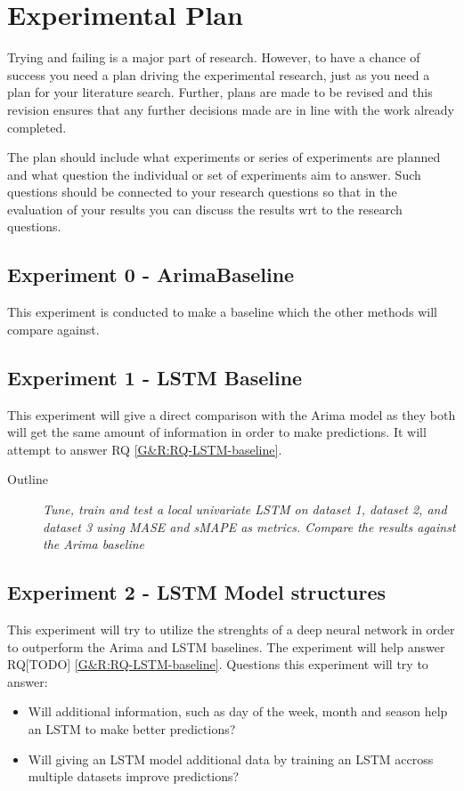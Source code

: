 
\section{Experimental Plan}
\label{sec:experimentalPlan}

Trying and failing is a major part of research. However, to have a chance of success you need a plan driving the experimental research, just as you need a plan for your literature search. Further, plans are made to be revised and this revision ensures that any further decisions made are in line with the work already completed.

The plan should include what experiments or series of experiments are planned and what question the individual or set of experiments aim to answer. Such questions should be connected to your research questions so that in the evaluation of your results you can discuss the results wrt to the research questions.


\subsection{Experiment 0 - ArimaBaseline}
This experiment is conducted to make a baseline which the other methods
will compare against.

\subsection{Experiment 1 - LSTM Baseline}
This experiment will give a direct comparison with the Arima model as they both will
get the same amount of information in order to make predictions.
It will attempt to answer RQ \cref{G&R:RQ-LSTM-baseline}.

\begin{description}
  \item[Outline]{\it Tune, train and test a local univariate LSTM on dataset 1,
              dataset 2, and dataset 3 using MASE and sMAPE as metrics. Compare the results against the Arima baseline}
\end{description}

\subsection{Experiment 2 - LSTM Model structures}
This experiment will try to utilize the strenghts of a deep neural network
in order to outperform the Arima and LSTM baselines. The experiment will
help answer RQ[TODO] \cref{G&R:RQ-LSTM-baseline}.
Questions this experiment will try to answer:
\begin{itemize}
  \item Will additional information, such as day of the week, month and season help an LSTM to make better predictions?
  \item {Will giving an LSTM model additional data by training an LSTM accross multiple datasets improve predictions?}
\end{itemize}

